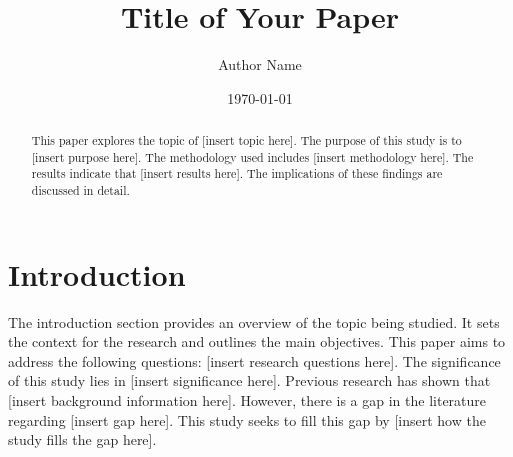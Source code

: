 \documentclass{article}
\title{Title of Your Paper}
\author{Author Name}
\date{\today}
\begin{document}
\maketitle

\begin{abstract}
This paper explores the topic of [insert topic here]. The purpose of this study is to [insert purpose here]. The methodology used includes [insert methodology here]. The results indicate that [insert results here]. The implications of these findings are discussed in detail.
\end{abstract}

\section{Introduction}

The introduction section provides an overview of the topic being studied. It sets the context for the research and outlines the main objectives. This paper aims to address the following questions: [insert research questions here]. The significance of this study lies in [insert significance here]. Previous research has shown that [insert background information here]. However, there is a gap in the literature regarding [insert gap here]. This study seeks to fill this gap by [insert how the study fills the gap here].
\end{document}
